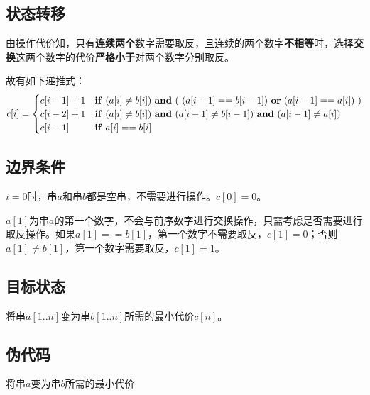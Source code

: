 \documentclass{article}
\begin{document}
\subsection{状态转移}
由操作代价知，只有\textbf{连续两个}数字需要取反，且连续的两个数字\textbf{不相等}时，选择\textbf{交换}这两个数字的代价\textbf{严格小于}对两个数字分别取反。

故有如下递推式：
$$
c[i]=\begin{cases}
c[i-1]+1& {\bf if}\ (a[i]\neq b[i])\ {\bf and} \ {\bf (\ }(a[i-1]== b[i-1])\ {\bf or} \ (a[i-1]== a[i]){\bf \  )}\\
c[i-2]+1& {\bf if}\ (a[i]\neq b[i])\ {\bf and} \ (a[i-1]\neq b[i-1])\ {\bf and} \ (a[i-1]\neq a[i])\\
c[i-1]& {\bf if}\ a[i]==b[i]
\end{cases}
$$

\subsection{边界条件}
$i=0$时，串$a$和串$b$都是空串，不需要进行操作。$c[0]=0$。

$a[1]$为串$a$的第一个数字，不会与前序数字进行交换操作，只需考虑是否需要进行取反操作。如果$a[1]==b[1]$，第一个数字不需要取反，$c[1]=0$；否则$a[1]\neq b[1]$，第一个数字需要取反，$c[1]=1$。

\subsection{目标状态}
将串$a[1..n]$变为串$b[1..n]$所需的最小代价$c[n]$。

\subsection{伪代码}
\begin{algorithm}[H]

\caption{将串$a$变为串$b$所需的最小代价}
\LinesNumbered
{}


\end{algorithm}
\end{document}
